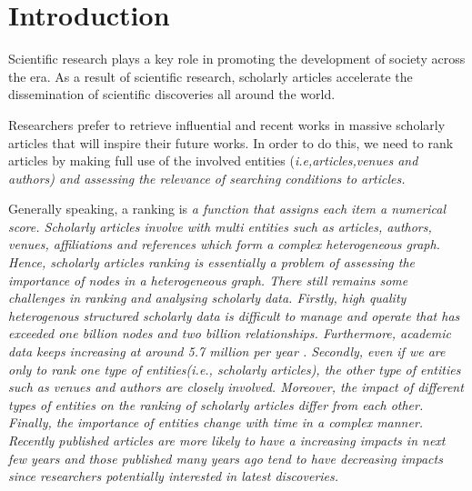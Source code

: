 \section{Introduction}
\label{sec-intro}
\par
Scientific research plays a key role in promoting the development of society across the era. As a result of scientific research, scholarly articles accelerate the dissemination of scientific discoveries all around the world.

\par
Researchers prefer to retrieve influential and recent works in massive scholarly articles that will inspire their future works. In order to do this, we need to rank articles by making full use of the involved entities (\itshape i.e,\upshape articles,venues and authors) and assessing the relevance of searching conditions to articles.

\par
Generally speaking, a ranking is \itshape a function that assigns each item a numerical score. \upshape Scholarly articles involve with multi entities such as articles, authors, venues, affiliations and references which form a complex heterogeneous graph. Hence, scholarly articles ranking is essentially a problem of assessing the importance of nodes in a heterogeneous graph. There still remains some challenges in ranking and analysing scholarly data. Firstly, high quality heterogenous structured scholarly data is difficult to manage and operate that has exceeded one billion nodes and two billion relationships. Furthermore, academic data keeps increasing at around 5.7 million per year \cite{sinha2015overview}. Secondly, even if we are only to rank one type of entities(\itshape i.e., \upshape scholarly articles), the other type of entities such as venues and authors are closely involved. Moreover, the impact of different types of entities on the ranking of scholarly articles differ from each other. Finally, the importance of entities change with time in a complex manner. Recently published articles are more likely to have a increasing impacts in next few years and those published many years ago tend to have decreasing impacts since researchers potentially interested in latest discoveries.

